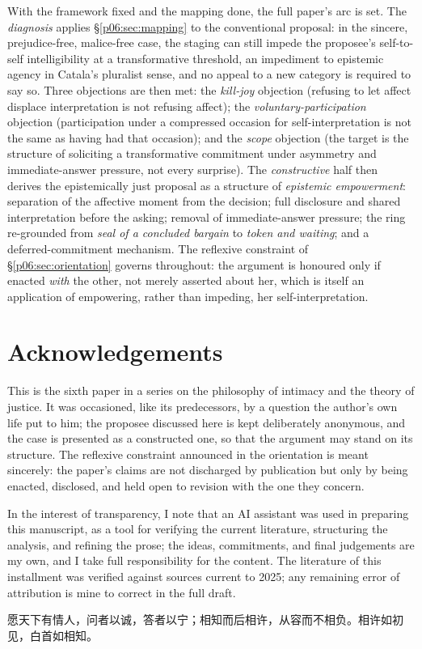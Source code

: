With the framework fixed and the mapping done, the full paper's arc is set. The \emph{diagnosis} applies §\ref{p06:sec:mapping} to the conventional proposal: in the sincere, prejudice-free, malice-free case, the staging can still impede the proposee's self-to-self intelligibility at a transformative threshold, an impediment to epistemic agency in Catala's pluralist sense, and no appeal to a new category is required to say so. Three objections are then met: the \emph{kill-joy} objection (refusing to let affect displace interpretation is not refusing affect); the \emph{voluntary-participation} objection (participation under a compressed occasion for self-interpretation is not the same as having had that occasion); and the \emph{scope} objection (the target is the structure of soliciting a transformative commitment under asymmetry and immediate-answer pressure, not every surprise). The \emph{constructive} half then derives the epistemically just proposal as a structure of \emph{epistemic empowerment}: separation of the affective moment from the decision; full disclosure and shared interpretation before the asking; removal of immediate-answer pressure; the ring re-grounded from \emph{seal of a concluded bargain} to \emph{token and waiting}; and a deferred-commitment mechanism. The reflexive constraint of §\ref{p06:sec:orientation} governs throughout: the argument is honoured only if enacted \emph{with} the other, not merely asserted about her, which is itself an application of empowering, rather than impeding, her self-interpretation.

\section*{Acknowledgements}

This is the sixth paper in a series on the philosophy of intimacy and the theory of justice. It was occasioned, like its predecessors, by a question the author's own life put to him; the proposee discussed here is kept deliberately anonymous, and the case is presented as a constructed one, so that the argument may stand on its structure. The reflexive constraint announced in the orientation is meant sincerely: the paper's claims are not discharged by publication but only by being enacted, disclosed, and held open to revision with the one they concern.

In the interest of transparency, I note that an AI assistant was used in preparing this manuscript, as a tool for verifying the current literature, structuring the analysis, and refining the prose; the ideas, commitments, and final judgements are my own, and I take full responsibility for the content. The literature of this installment was verified against sources current to 2025; any remaining error of attribution is mine to correct in the full draft.

\begin{center}
{\cjkfont\color{rosedeep} 愿天下有情人，问者以诚，答者以宁；相知而后相许，从容而不相负。相许如初见，白首如相知。}
\end{center}

